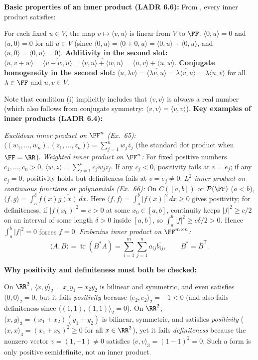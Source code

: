 \documentclass[10pt]{scrartcl}
\newcommand{\ip}[2]{\langle #1,#2\rangle}
\DeclareMathOperator{\tr}{tr}\DeclareMathOperator{\nul}{null}\DeclareMathOperator{\range}{range}\DeclareMathOperator{\spn}{span}
\begin{document}
\begin{itemize}
  \ii \textbf{Basic properties of an inner product (LADR 6.6):} From , every inner product satisfies:
  \begin{enumerate}[(a)]
    \ii For each fixed $u\in V$, the map $v\mapsto\ip vu$ is linear from $V$ to $\FF$.
    \ii $\ip 0u=0$ and $\ip u0=0$ for all $u\in V$ (since $\ip 0u=\ip{0+0}{u}=\ip 0u+\ip 0u$, and $\ip u0=\overline{\ip 0u}=0$).
    \ii \textbf{Additivity in the second slot:} $\ip u{v+w}=\overline{\ip{v+w}{u}}=\overline{\ip vu+\ip wu}=\ip uv+\ip uw$.
    \ii \textbf{Conjugate homogeneity in the second slot:} $\ip u{\lambda v}=\overline{\ip{\lambda v}{u}}=\overline{\lambda\ip vu}=\overline{\lambda}\ip uv$ for all $\lambda\in\FF$ and $u,v\in V$.
  \end{enumerate}
  Note that condition (i) implicitly includes that $\ip vv$ is always a real number (which also follows from conjugate symmetry: $\ip vv=\overline{\ip vv}$).
  \ii \textbf{Key examples of inner products (LADR 6.4):}
  \begin{itemize}
    \ii \emph{Euclidean inner product on $\FF^n$ (Ex.~65):} $\ip{(w_1,\dots,w_n)}{(z_1,\dots,z_n)}=\sum_{j=1}^n w_j\overline{z_j}$ (the standard dot product when $\FF=\RR$).
    \ii \emph{Weighted inner product on $\FF^n$:} For fixed positive numbers $c_1,\dots,c_n>0$, $\ip wz=\sum_{j=1}^n c_jw_j\overline{z_j}$. If any $c_j<0$, positivity fails at $v=e_j$; if any $c_j=0$, positivity holds but definiteness fails at $v=e_j\ne 0$.
    \ii \emph{$L^2$ inner product on continuous functions or polynomials (Ex.~66):} On $C([a,b])$ or $\PP(\FF)$ ($a<b$), $\ip fg=\int_a^b f(x)\overline{g(x)}\,dx$. Here $\ip ff=\int_a^b |f(x)|^2\,dx\ge 0$ gives positivity; for definiteness, if $|f(x_0)|^2=c>0$ at some $x_0\in[a,b]$, continuity keeps $|f|^2\ge c/2$ on an interval of some length $\delta>0$ inside $[a,b]$, so $\int_a^b|f|^2\ge c\delta/2>0$. Hence $\int_a^b|f|^2=0$ forces $f=0$.
    \ii \emph{Frobenius inner product on $\FF^{m\times n}$:} \[ \ip AB=\tr(B^*A)=\sum_{i=1}^m\sum_{j=1}^n a_{ij}\overline{b_{ij}},\qquad B^*=\overline{B}^{\mathsf T}. \]
  \end{itemize}
  \ii \textbf{Why positivity and definiteness must both be checked:}
  \begin{itemize}
    \ii On $\RR^2$, $\ip xy_2=x_1y_1-x_2y_2$ is bilinear and symmetric, and even satisfies $\ip 00_2=0$, but it fails \emph{positivity} because $\ip{e_2}{e_2}_2=-1<0$ (and also fails definiteness since $\ip{(1,1)}{(1,1)}_2=0$).
    \ii On $\RR^2$, $\ip xy_3=(x_1+x_2)(y_1+y_2)$ is bilinear, symmetric, and satisfies \emph{positivity} ($\ip xx_3=(x_1+x_2)^2\ge 0$ for all $x\in\RR^2$), yet it fails \emph{definiteness} because the nonzero vector $v=(1,-1)\ne 0$ satisfies $\ip vv_3=(1-1)^2=0$. Such a form is only positive semidefinite, not an inner product.
  \end{itemize}
\end{itemize}
\end{document}

